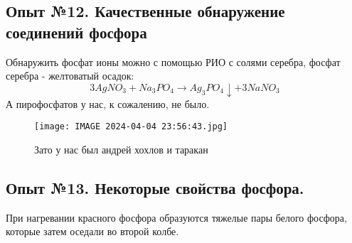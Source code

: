 \documentclass[a4paper,12pt]{article}
\begin{document}
\subsection{Опыт №12. Качественные обнаружение соединений фосфора}
Обнаружить фосфат ионы можно с помощью РИО с солями серебра, фосфат серебра - желтоватый осадок:
\begin{equation}
    3AgNO_3 + Na_3PO_4 \xrightarrow[]{} Ag_3PO_4\downarrow + 3NaNO_3
\end{equation}
А пирофосфатов у нас, к сожалению, не было.
\begin{figure}[H]
    \centering
    \texttt{[image: IMAGE 2024-04-04 23:56:43.jpg]}
    \caption{Зато у нас был андрей хохлов и таракан}
    \label{fig:enter-label}
\end{figure}
\subsection{Опыт №13. Некоторые свойства фосфора.}
При нагревании красного фосфора образуются тяжелые пары белого фосфора, которые затем оседали во второй колбе.
\end{document}
